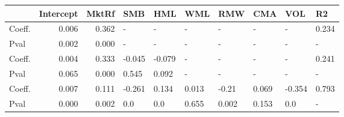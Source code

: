 \begin{tabular}{lrrlllllll}
\toprule
{} &  Intercept &  MktRf &    SMB &    HML &    WML &    RMW &    CMA &    VOL &     R2 \\
\midrule
Coeff.  &      0.006 &  0.362 &      - &      - &      - &      - &      - &      - &  0.234 \\
Pval    &      0.002 &  0.000 &      - &      - &      - &      - &      - &      - &      - \\
Coeff.  &      0.004 &  0.333 & -0.045 & -0.079 &      - &      - &      - &      - &  0.241 \\
Pval    &      0.065 &  0.000 &  0.545 &  0.092 &      - &      - &      - &      - &      - \\
Coeff.  &      0.007 &  0.111 & -0.261 &  0.134 &  0.013 &  -0.21 &  0.069 & -0.354 &  0.793 \\
Pval    &      0.000 &  0.002 &    0.0 &    0.0 &  0.655 &  0.002 &  0.153 &    0.0 &      - \\
\bottomrule
\end{tabular}
